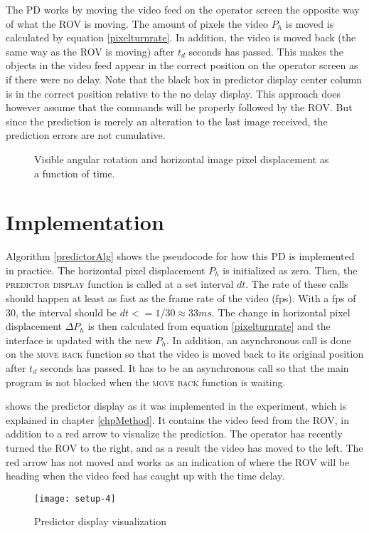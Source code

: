 The PD works by moving the video feed on the operator screen the opposite way of what the ROV is moving. The amount of pixels the video $P_h$ is moved is calculated by equation \ref{pixelturnrate}. In addition, the video is moved back (the same way as the ROV is moving) after $t_d$ seconds has passed. This makes the objects in the video feed appear in the correct position on the operator screen as if there were no delay. Note that the black box in  predictor display center column is in the correct position relative to the no delay display. This approach does however assume that the commands will be properly followed by the ROV. But since the prediction is merely an alteration to the last image received, the prediction errors are not cumulative.


\begin{figure}[h!]    
    \centering           
    \def\svgwidth{\columnwidth}
    
    \caption{Visible angular rotation and horizontal image pixel displacement as a function of time.}
    \label{timePlot}
\end{figure}

\vspace{-3mm}
\section{Implementation}

Algorithm \ref{predictorAlg} shows the pseudocode for how this PD is implemented in practice. The horizontal pixel displacement $P_h$ is initialized as zero. Then, the \textsc{predictor display} function is called at a set interval $dt$. The rate of these calls should happen at least as fast as the frame rate of the video (fps). With a fps of 30, the interval should be $dt <= 1/30 \approx 33 ms$. The change in horizontal pixel displacement $\Delta P_h$ is then calculated from equation \ref{pixelturnrate} and the interface is updated with the new $P_h$. In addition, an asynchronous call is done on the \textsc{move back} function so that the video is moved back to its original position after $t_d$ seconds has passed. It has to be an asynchronous call so that the main program is not blocked when the \textsc{move back} function is waiting.




 shows the predictor display as it was implemented in the experiment, which is explained in chapter \ref{chpMethod}. It contains the video feed from the ROV, in addition to a red arrow to visualize the prediction. The operator has recently turned the ROV to the right, and as a result the video has moved to the left. The red arrow has not moved and works as an indication of where the ROV will be heading when the video feed has caught up with the time delay.
\begin{figure}[h!]
    \centering
    \texttt{[image: setup-4]}
    \caption{Predictor display visualization}
    \label{predictorvis}
\end{figure}


